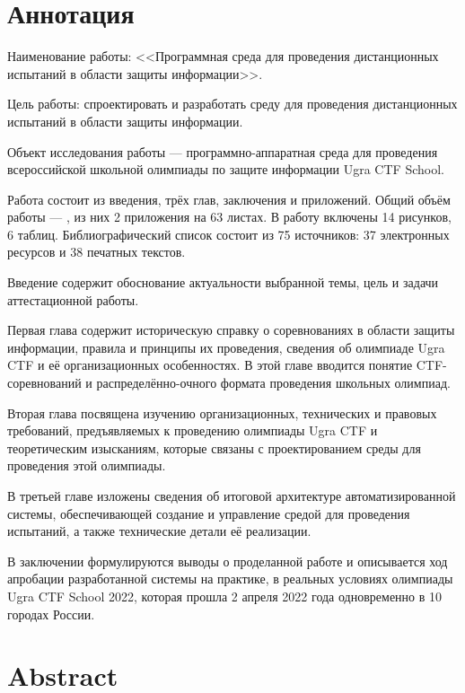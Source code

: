 
\pagestyle{empty}

\chapter*{Аннотация}

Наименование работы: <<Программная среда для проведения дистанционных испытаний в области защиты информации>>.

Цель работы: спроектировать и разработать среду для проведения дистанционных испытаний в области защиты информации.

Объект исследования работы --- программно-аппаратная среда для проведения всероссийской школьной олимпиады по защите информации Ugra CTF School.

Работа состоит из введения, трёх глав, заключения и приложений. Общий объём работы --- \pageref{LastPage}, из них 2 приложения на 63 листах. В работу включены 14 рисунков, 6 таблиц. Библиографический список состоит из 75 источников: 37 электронных ресурсов и 38 печатных текстов.

Введение содержит обоснование актуальности выбранной темы, цель и задачи аттестационной работы.

Первая глава содержит историческую справку о соревнованиях в области защиты информации, правила и принципы их проведения, сведения об олимпиаде Ugra CTF и её организационных особенностях. В этой главе вводится понятие CTF-соревнований и распределённо-очного формата проведения школьных олимпиад.

Вторая глава посвящена изучению организационных, технических и правовых требований, предъявляемых к проведению олимпиады Ugra CTF и теоретическим изысканиям, которые связаны с проектированием среды для проведения этой олимпиады.

В третьей главе изложены сведения об итоговой архитектуре автоматизированной системы, обеспечивающей создание и управление средой для проведения испытаний, а также технические детали её реализации.

В заключении формулируются выводы о проделанной работе и описывается ход апробации разработанной системы на практике, в реальных условиях олимпиады Ugra CTF School 2022, которая прошла 2 апреля 2022 года одновременно в 10 городах России.

\pagestyle{empty}
\chapter*{Abstract}

